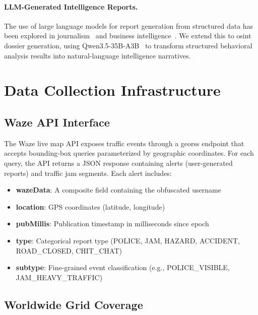 \documentclass[11pt,a4paper]{article}
\begin{document}
\paragraph{LLM-Generated Intelligence Reports.}
The use of large language models for report generation from structured data has been explored in journalism~\cite{leppanen2017automated} and business intelligence~\cite{tang2023llmreport}. We extend this to \gls{osint} dossier generation, using Qwen3.5-35B-A3B~\cite{qwen2024qwen25} to transform structured behavioral analysis results into natural-language intelligence narratives.

\section{Data Collection Infrastructure}
\label{sec:data_collection}

\subsection{Waze API Interface}

The Waze live map API exposes traffic events through a georss endpoint that accepts bounding-box queries parameterized by geographic coordinates. For each query, the API returns a JSON response containing alerts (user-generated reports) and traffic jam segments. Each alert includes:

\begin{itemize}
    \item \textbf{wazeData}: A composite field containing the obfuscated username
    \item \textbf{location}: GPS coordinates (latitude, longitude)
    \item \textbf{pubMillis}: Publication timestamp in milliseconds since epoch
    \item \textbf{type}: Categorical report type (POLICE, JAM, HAZARD, ACCIDENT, ROAD\_CLOSED, CHIT\_CHAT)
    \item \textbf{subtype}: Fine-grained event classification (e.g., POLICE\_VISIBLE, JAM\_HEAVY\_TRAFFIC)
\end{itemize}

\subsection{Worldwide Grid Coverage}
\end{document}
